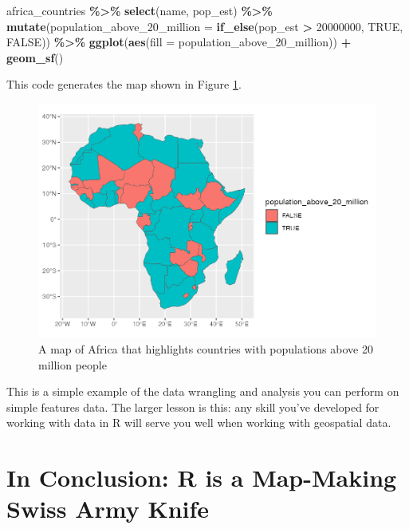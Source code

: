 \documentclass[
]{book}
\newenvironment{Shaded}{\begin{snugshade}}{\end{snugshade}}
\newcommand{\AttributeTok}[1]{\textcolor[rgb]{0.13,0.29,0.53}{#1}}
\newcommand{\ConstantTok}[1]{\textcolor[rgb]{0.56,0.35,0.01}{#1}}
\newcommand{\DecValTok}[1]{\textcolor[rgb]{0.00,0.00,0.81}{#1}}
\newcommand{\FunctionTok}[1]{\textcolor[rgb]{0.13,0.29,0.53}{\textbf{#1}}}
\newcommand{\NormalTok}[1]{#1}
\newcommand{\SpecialCharTok}[1]{\textcolor[rgb]{0.81,0.36,0.00}{\textbf{#1}}}
\begin{document}
\begin{Shaded}
\begin{Highlighting}[]
\NormalTok{africa\_countries }\SpecialCharTok{\%\textgreater{}\%}
  \FunctionTok{select}\NormalTok{(name, pop\_est) }\SpecialCharTok{\%\textgreater{}\%}
  \FunctionTok{mutate}\NormalTok{(}\AttributeTok{population\_above\_20\_million =} \FunctionTok{if\_else}\NormalTok{(pop\_est }\SpecialCharTok{\textgreater{}} \DecValTok{20000000}\NormalTok{, }\ConstantTok{TRUE}\NormalTok{, }\ConstantTok{FALSE}\NormalTok{)) }\SpecialCharTok{\%\textgreater{}\%}
  \FunctionTok{ggplot}\NormalTok{(}\FunctionTok{aes}\NormalTok{(}\AttributeTok{fill =}\NormalTok{ population\_above\_20\_million)) }\SpecialCharTok{+}
  \FunctionTok{geom\_sf}\NormalTok{()}
\end{Highlighting}
\end{Shaded}

This code generates the map shown in Figure \ref{fig:africa-map-20m}.

\begin{figure}
\includegraphics[width=1\linewidth]{maps_files/figure-latex/africa-map-20m-1} \caption{A map of Africa that highlights countries with populations above 20 million people}\label{fig:africa-map-20m}
\end{figure}

This is a simple example of the data wrangling and analysis you can perform on simple features data. The larger lesson is this: any skill you've developed for working with data in R will serve you well when working with geospatial data.

\hypertarget{in-conclusion-r-is-a-map-making-swiss-army-knife}{%
\section*{In Conclusion: R is a Map-Making Swiss Army Knife}\label{in-conclusion-r-is-a-map-making-swiss-army-knife}}
\end{document}
